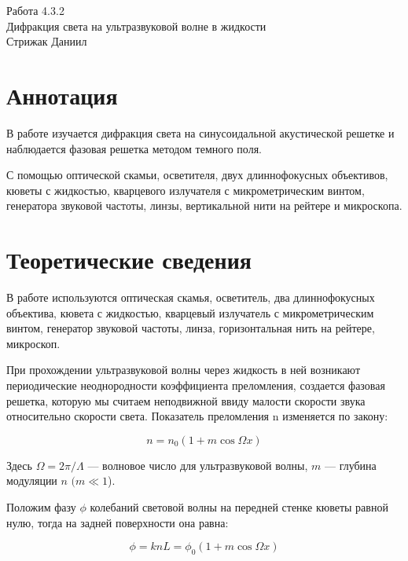 



\begin{center}
  \LARGE{Работа 4.3.2}\\[0.2cm]
  \LARGE{Дифракция света на ультразвуковой волне в жидкости}\\[0.2cm]
  \large{Стрижак Даниил}\\[0.2cm]
\end{center}  
  

\section{Аннотация}

В работе изучается дифракция света на синусоидальной акустической решетке и наблюдается фазовая решетка методом темного поля.
	
С помощью оптической скамьи, осветителя, двух длиннофокусных объективов, кюветы с жидкостью, кварцевого излучателя с микрометрическим винтом, генератора звуковой частоты, линзы, вертикальной нити на рейтере и микроскопа.


\section{Теоретические сведения}

	В работе используются оптическая скамья, осветитель, два длиннофокусных объектива, кювета с жидкостью, кварцевый излучатель с микрометрическим винтом, генератор звуковой частоты, линза, горизонтальная нить на рейтере, микроскоп. 
	
	При прохождении ультразвуковой волны через жидкость в ней возникают периодические неоднородности коэффициента преломления, создается фазовая решетка, которую мы считаем неподвижной ввиду малости скорости звука относительно скорости света. Показатель
	преломления n изменяется по закону:
	
	\begin{equation}\label{}
	n = n_0 (1 + m \cos \Omega x)
	\end{equation}
	
	Здесь $ \Omega = 2 \pi / \Lambda $ --- волновое число для ультразвуковой волны, $ m $ --- глубина модуляции $ n $ $ (m \ll 1 $).
	
	Положим фазу $ \phi $ колебаний световой волны на передней стенке кюветы равной нулю, тогда на задней поверхности она равна:
	
	\begin{equation}\label{}
	\phi  = k n L = \phi_0 (1 + m \cos \Omega x)
	\end{equation}
	
